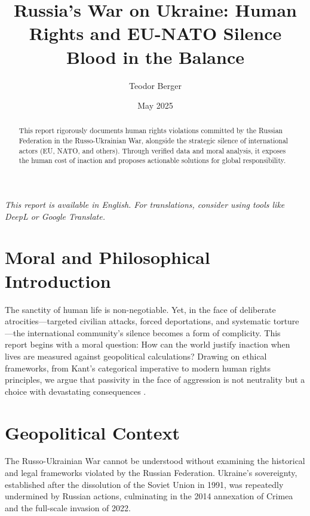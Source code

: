 \documentclass[a4paper,12pt]{article}
\title{Russia’s War on Ukraine: Human Rights and EU-NATO Silence \\ \large Blood in the Balance}
\author{Teodor Berger}
\date{May 2025}
\begin{document}
\maketitle

\begin{center}
\end{center}

\begin{abstract}
This report rigorously documents human rights violations committed by the Russian Federation in the Russo-Ukrainian War, alongside the strategic silence of international actors (EU, NATO, and others). Through verified data and moral analysis, it exposes the human cost of inaction and proposes actionable solutions for global responsibility.
\end{abstract}

\vspace{1em}
\noindent\textit{This report is available in English. For translations, consider using tools like DeepL or Google Translate.}

\section{Moral and Philosophical Introduction}
The sanctity of human life is non-negotiable. Yet, in the face of deliberate atrocities—targeted civilian attacks, forced deportations, and systematic torture—the international community’s silence becomes a form of complicity. This report begins with a moral question: How can the world justify inaction when lives are measured against geopolitical calculations? Drawing on ethical frameworks, from Kant’s categorical imperative to modern human rights principles, we argue that passivity in the face of aggression is not neutrality but a choice with devastating consequences \cite{un_2023}.

\section{Geopolitical Context}
The Russo-Ukrainian War cannot be understood without examining the historical and legal frameworks violated by the Russian Federation. Ukraine’s sovereignty, established after the dissolution of the Soviet Union in 1991, was repeatedly undermined by Russian actions, culminating in the 2014 annexation of Crimea and the full-scale invasion of 2022.
\end{document}
